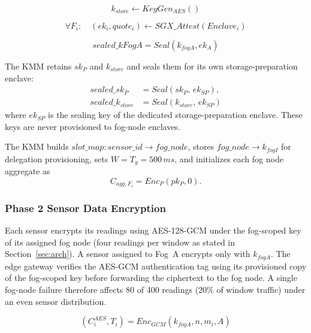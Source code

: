 \documentclass[conference]{IEEEtran}
\begin{document}
    \begin{equation}
    k_{store} \leftarrow KeyGen_{AES}()
    \end{equation}

    \begin{equation}
    \forall F_i:\quad (ek_i, quote_i) \leftarrow SGX\_Attest(Enclave_i)
    \end{equation}

    \begin{equation}
    sealed\_kFogA = Seal(k_{fogA}, ek_A)
    \end{equation}

    The KMM retains $sk_P$ and $k_{store}$ and seals them for its own storage-preparation enclave:
    \begin{equation}
    \begin{aligned}
    sealed\_sk_P &= Seal(sk_P,\, ek_{SP}),\\
    sealed\_k_{store} &= Seal(k_{store},\, ek_{SP})
    \end{aligned}
    \end{equation}
    where $ek_{SP}$ is the sealing key of the dedicated storage-preparation enclave. These keys are never provisioned to fog-node enclaves.

    The KMM builds $slot\_map:sensor\_id\rightarrow fog\_node$, stores $fog\_node\rightarrow k_{fogI}$ for delegation provisioning, sets $W=T_g=500\,ms$, and initializes each fog node aggregate as
    \begin{equation}
    C_{agg,F_i} = Enc_P(pk_P,0).
    \end{equation}

    \subsubsection{\textbf{Phase 2 Sensor Data Encryption}}

    Each sensor encrypts its readings using AES-128-GCM under the fog-scoped key of its assigned fog node (four readings per window as stated in Section~\ref{sec:arch}). A sensor assigned to Fog~A encrypts only with $k_{fogA}$. The edge gateway verifies the AES-GCM authentication tag using its provisioned copy of the fog-scoped key before forwarding the ciphertext to the fog node. A single fog-node failure therefore affects 80 of 400 readings (20\% of window traffic) under an even sensor distribution.

    \begin{equation}
    (C_i^{AES},T_i) = Enc_{GCM}(k_{fogA}, n, m_i, A)
    \end{equation}
\end{document}
